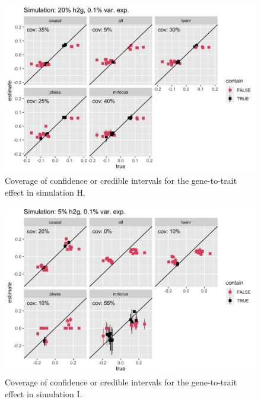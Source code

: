 \documentclass[11pt]{article}
\begin{document}
\begin{figure}[!ht]
  \centering
  \includegraphics[width=.8\textwidth]{figs/cover7.png}
  \caption{Coverage of confidence or credible intervals for the
    gene-to-trait effect in simulation H.}
\end{figure}

\begin{figure}[!ht]
  \centering
  \includegraphics[width=.8\textwidth]{figs/cover9.png}
  \caption{Coverage of confidence or credible intervals for the
    gene-to-trait effect in simulation I.}
\end{figure}
\end{document}
